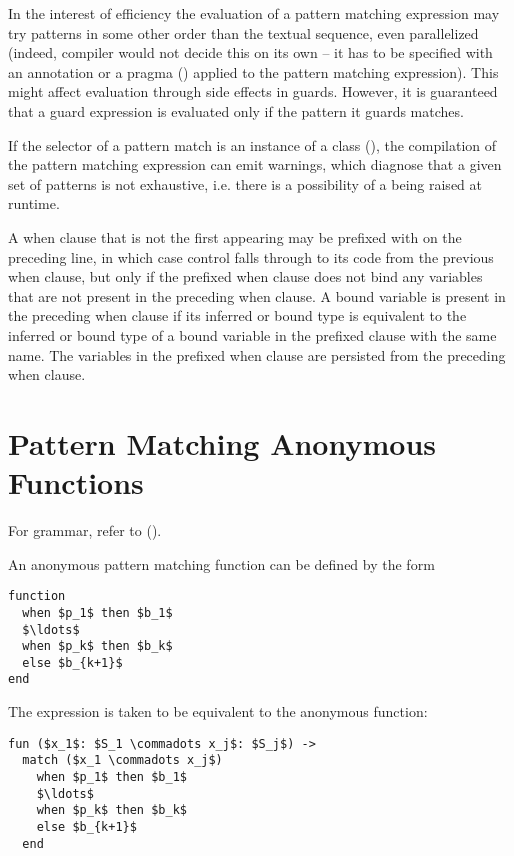 In the interest of efficiency the evaluation of a pattern matching expression may try patterns in some other order than the textual sequence, even parallelized (indeed, compiler would not decide this on its own -- it has to be specified with an annotation or a pragma () applied to the pattern matching expression). This might affect evaluation through side effects in guards. However, it is guaranteed that a guard expression is evaluated only if the pattern it guards matches.

If the selector of a pattern match is an instance of a  class (), the compilation of the pattern matching expression can emit warnings, which diagnose that a given set of patterns is not exhaustive, i.e. there is a possibility of a  being raised at runtime. 

A when clause that is not the first appearing may be prefixed with  on the preceding line, in which case control falls through to its code from the previous when clause, but only if the prefixed when clause does not bind any variables that are not present in the preceding when clause. A bound variable is present in the preceding when clause if its inferred or bound type is equivalent to the inferred or bound type of a bound variable in the prefixed clause with the same name. The variables in the prefixed when clause are persisted from the preceding when clause. 






\section{Pattern Matching Anonymous Functions}
\label{sec:pattern-matching-anon-fun}

For grammar, refer to ().

An anonymous pattern matching function can be defined by the form
\begin{lstlisting}
function 
  when $p_1$ then $b_1$ 
  $\ldots$ 
  when $p_k$ then $b_k$ 
  else $b_{k+1}$
end
\end{lstlisting}

The expression is taken to be equivalent to the anonymous function:
\begin{lstlisting}
fun ($x_1$: $S_1 \commadots x_j$: $S_j$) ->
  match ($x_1 \commadots x_j$)
    when $p_1$ then $b_1$
    $\ldots$
    when $p_k$ then $b_k$
    else $b_{k+1}$
  end
\end{lstlisting}

